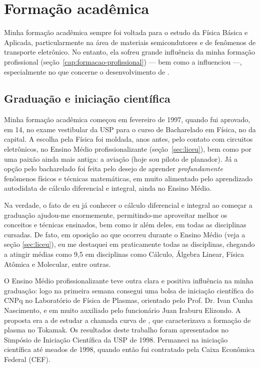 \section{Formação acadêmica}

Minha formação acadêmica sempre foi voltada para o estudo da Física Básica e Aplicada, particularmente na área de materiais semicondutores e de fenômenos de transporte eletrônico. No entanto, ela sofreu grande influência da minha formação profissional (seção~\ref{cap:formacao-profissional}) --- bem como a influenciou ---, especialmente no que concerne o desenvolvimento de .

\subsection{Graduação e iniciação científica}
\label{sec:graduacao}

Minha formação acadêmica começou em fevereiro de 1997, quando fui aprovado, em 14\textordmasculine, no exame vestibular da USP para o curso de Bacharelado em Física, no  da capital. A escolha pela Física foi moldada, anos antes, pelo contato com circuitos eletrônicos, no Ensino Médio profissionalizante (seção~\ref{sec:liceu}), bem como por uma paixão ainda mais antiga: a aviação (hoje sou piloto de planador). Já a opção pelo bacharelado foi feita pelo desejo de aprender \emph{profundamente} fenômenos físicos e técnicas matemáticas, em muito alimentado pelo aprendizado autodidata de cálculo diferencial e integral, ainda no Ensino Médio.

Na verdade, o fato de eu já conhecer o cálculo diferencial e integral ao começar a graduação ajudou-me enormemente, permitindo-me aproveitar melhor os conceitos e técnicas ensinados, bem como ir além deles, em todas as disciplinas cursadas. De fato, em oposição ao que ocorreu durante o Ensino Médio (veja a seção \ref{sec:liceu}), eu me destaquei em praticamente todas as disciplinas, chegando a atingir médias como 9,5 em disciplinas como Cálculo, Álgebra Linear, Física Atômica e Molecular, entre outras.

O Ensino Médio profissionalizante teve outra clara e positiva influência na minha graduação: logo na primeira semana consegui uma bolsa de iniciação científica do CNPq no Laboratório de Física de Plasmas, orientado pelo Prof. Dr. Ivan Cunha Nascimento, e em muito auxiliado pelo funcionário Juan Iraburu Elizondo. A proposta era a de estudar a chamada curva de , que caracterizava a formação de plasma no Tokamak. Os resultados deste trabalho foram apresentados no Simpósio de Iniciação Científica da USP de 1998. Permaneci na iniciação científica até meados de 1998, quando então fui contratado pela Caixa Econômica Federal (CEF).

